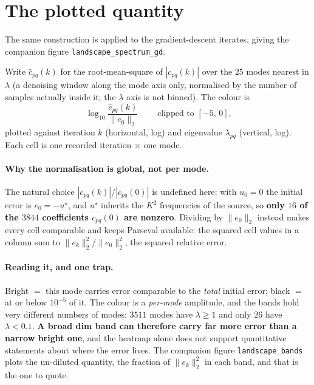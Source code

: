 \documentclass[11pt]{article}
\begin{document}
\section*{The plotted quantity}

The same construction is applied to the gradient-descent iterates, giving the companion figure
\texttt{landscape\_spectrum\_gd}.

Write $\hat c_{pq}(k)$ for the root-mean-square of $|c_{pq}(k)|$ over the $25$ modes nearest in
$\lambda$ (a denoising window along the mode axis only, normalised by the number of samples
actually inside it; the $\lambda$ axis is not binned). The colour is
\begin{equation*}
   \boxed{\;
   \log_{10}\frac{\hat c_{pq}(k)}{\|e_0\|_2}\;}
   \qquad\text{clipped to }[-5,\,0],
\end{equation*}
plotted against iteration $k$ (horizontal, log) and eigenvalue $\lambda_{pq}$ (vertical, log).
Each cell is one recorded iteration $\times$ one mode.

\paragraph{Why the normalisation is global, not per mode.}
The natural choice $|c_{pq}(k)|/|c_{pq}(0)|$ is undefined here: with $u_0=0$ the initial error is
$e_0=-u^\star$, and $u^\star$ inherits the $K^2$ frequencies of the source, so \textbf{only $16$ of
the $3844$ coefficients $c_{pq}(0)$ are nonzero}. Dividing by $\|e_0\|_2$ instead makes every cell
comparable and keeps Parseval available: the squared cell values in a column sum to
$\|e_k\|_2^2/\|e_0\|_2^2$, the squared relative error.

\paragraph{Reading it, and one trap.} Bright $=$ this mode carries error comparable to the
\emph{total} initial error; black $=$ at or below $10^{-5}$ of it. The colour is a \emph{per-mode}
amplitude, and the bands hold very different numbers of modes: $3511$ modes have $\lambda\ge1$ and
only $26$ have $\lambda<0.1$. \textbf{A broad dim band can therefore carry far more error than a
narrow bright one}, and the heatmap alone does not support quantitative statements about where the
error lives. The companion figure \texttt{landscape\_bands} plots the un-diluted quantity, the
fraction of $\|e_k\|_2^2$ in each band, and that is the one to quote.
\end{document}
